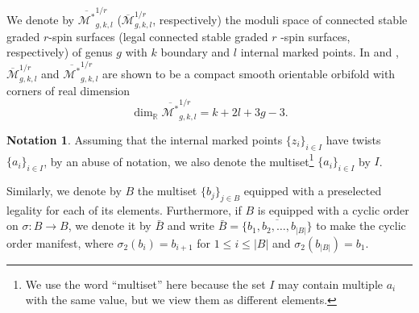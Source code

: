 \documentclass[11pt]{amsart}
\theoremstyle{definition}
\newtheorem{nn}[dummy]{Notation}
\theoremstyle{remark}
\newcommand{\<}{\left<}
\renewcommand{\>}{\right>}
\numberwithin{equation}{section}
\def\Mbar{{\overline{\mathcal M}}}
\def\Mbarstar{{\overline{\mathcal M^*}}}
\begin{document}
We %
denote by $\Mbarstar_{g,k,l}^{1/r}$ %
($\Mbar_{g,k,l}^{1/r}$, respectively) %
the moduli space of connected stable graded $r$-spin surfaces (legal connected stable graded $r$%
-spin surfaces, respectively) %
of genus $g$ with $k$ boundary and $l$ internal marked points. In \cite[Theorem 3.4]{BCT1} and \cite[Theorem 2.8]{TZ1}, $\Mbar_{g,k,l}^{1/r}$ and $\Mbarstar_{g,k,l}^{1/r}$ are shown to be a compact smooth orientable orbifold %
with corners of %
real dimension 
\begin{equation}\label{eq dim of moduli}
\dim_{\mathbb R} \Mbarstar_{g,k,l}^{1/r}=k+2l+3g-3.
\end{equation}



\begin{nn}
    Assuming that the internal marked points $\{z_i\}_{i\in I}$ have twists $\{a_i\}_{i\in I}$, by an abuse of notation, we also denote %
the multiset\footnote{We use the word ``multiset'' here because the set $I$ may contain multiple $a_i$ with the same value, but we view them as different elements.} $\{a_i\}_{i\in I}$ %
by $I$.
    
Similarly, we denote by $B$ the multiset $\{b_j\}_{j\in B}$ equipped with a preselected legality for each of its elements. Furthermore, if $B$ is equipped with a cyclic order on $\sigma\colon B\to B$, we denote it by $\bar B$ and write $\bar{B}=\overline{\{b_1,b_2,\dots,b_{\lvert B \rvert}\}}$ to make the cyclic order manifest, where $\sigma_2(b_i)=b_{i+1}$ for $1\le i \le \lvert B \rvert$ and $\sigma_2(b_{\lvert B \rvert})=b_{1}$.
\end{nn}
\end{document}

